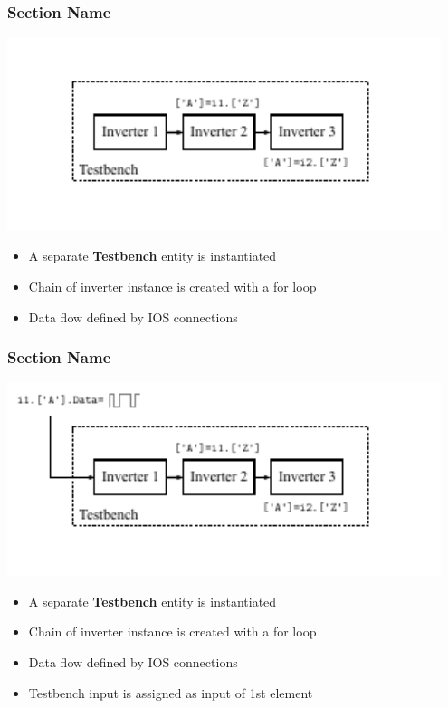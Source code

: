 \documentclass[logo=bluequo,normaltitle]{aaltoslides}
\newcommand{\sectname}{Section Name}
\begin{document}
\begin{frame}[t]
    \frametitle{\sectname}
    \centering
    \includegraphics[width=0.95\textwidth]{Pics/inverter_chain_2}
    \begin{itemize}
        \item A separate \textbf{Testbench} entity is instantiated
        \item Chain of inverter instance is created with a for loop
        \item Data flow defined by IOS connections
    \end{itemize}
\end{frame}


\begin{frame}[t]
    \frametitle{\sectname}
    \centering
    \includegraphics[width=0.95\textwidth]{Pics/inverter_chain_3}
    \begin{itemize}
        \item A separate \textbf{Testbench} entity is instantiated
        \item Chain of inverter instance is created with a for loop
        \item Data flow defined by IOS connections
        \item Testbench input is assigned as input of 1st element
    \end{itemize}
\end{frame}
\end{document}
